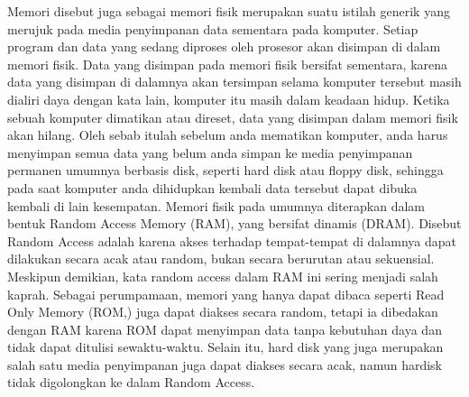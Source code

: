 ﻿%

Memori disebut juga sebagai memori fisik merupakan suatu istilah generik yang merujuk pada media penyimpanan data sementara pada komputer. Setiap program dan data yang sedang diproses oleh prosesor akan disimpan di dalam memori fisik. Data yang disimpan pada memori fisik bersifat sementara, karena data yang disimpan di dalamnya akan tersimpan selama komputer tersebut masih dialiri daya dengan kata lain, komputer itu masih dalam keadaan hidup. Ketika sebuah komputer dimatikan atau direset, data yang disimpan dalam memori fisik akan hilang. Oleh sebab itulah sebelum anda mematikan komputer, anda harus menyimpan semua data yang belum anda simpan ke media penyimpanan permanen umumnya berbasis disk, seperti hard disk atau floppy disk, sehingga pada saat komputer anda dihidupkan kembali data tersebut dapat dibuka kembali di lain kesempatan. Memori fisik pada umumnya diterapkan dalam bentuk Random Access Memory (RAM), yang bersifat dinamis (DRAM). Disebut Random Access adalah karena akses terhadap tempat-tempat di dalamnya dapat dilakukan secara acak atau random, bukan secara berurutan atau sekuensial. Meskipun demikian, kata random access dalam RAM ini sering menjadi salah kaprah. Sebagai perumpamaan, memori yang hanya dapat dibaca seperti Read Only Memory (ROM,) juga dapat diakses secara random, tetapi ia dibedakan dengan RAM karena ROM dapat menyimpan data tanpa kebutuhan daya dan tidak dapat ditulisi sewaktu-waktu. Selain itu, hard disk yang juga merupakan salah satu media penyimpanan juga dapat diakses secara acak, namun hardisk tidak digolongkan ke dalam Random Access.

